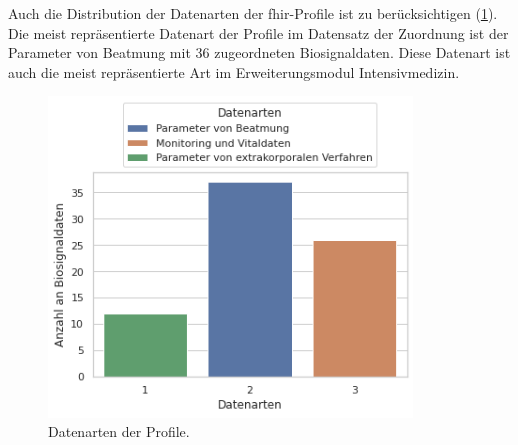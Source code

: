 Auch die Distribution der Datenarten der \ac{fhir}-Profile ist zu berücksichtigen (\ref{fig:datenarten}). Die meist repräsentierte Datenart der Profile im Datensatz der Zuordnung ist der \glqq Parameter von Beatmung\grqq{} mit 36 zugeordneten Biosignaldaten. Diese Datenart ist auch die meist repräsentierte Art im Erweiterungsmodul \glqq Intensivmedizin\grqq{}.

\clearpage

\begin{figure}[ht]
	\centering
	\includegraphics[height=8.5cm]{figures/datenarten}
	\caption[Datenarten der Profile]{Datenarten der Profile.}
	\label{fig:datenarten}
\end{figure}

